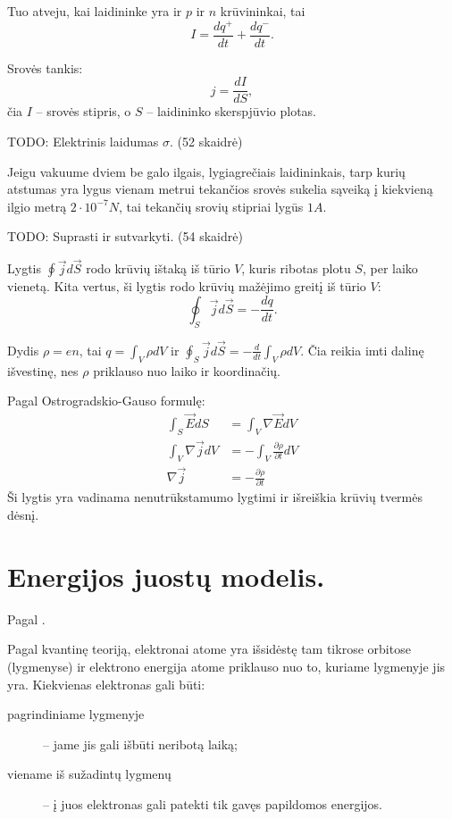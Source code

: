 Tuo atveju, kai laidininke yra ir $p$ ir $n$ krūvininkai, tai
\begin{equation*}
  I = \frac{dq^{+}}{dt} + \frac{dq^{-}}{dt}.
\end{equation*}

Srovės tankis:
\begin{equation*}
  j = \frac{dI}{dS},
\end{equation*}
čia $I$ – srovės stipris, o $S$ – laidininko skerspjūvio plotas.

TODO: Elektrinis laidumas $\sigma$. (52 skaidrė)

\begin{defn}[Amperas]
  Jeigu vakuume dviem be galo ilgais, lygiagrečiais laidininkais,
  tarp kurių atstumas yra lygus vienam metrui tekančios srovės
  sukelia sąveiką į kiekvieną ilgio metrą
  $2\cdot 10^{-7} N$, tai tekančių srovių stipriai lygūs $1A$.
\end{defn}

TODO: Suprasti ir sutvarkyti. (54 skaidrė)

Lygtis $\oint \vec{j} d \vec{S}$ rodo krūvių ištaką iš tūrio $V$,
kuris ribotas plotu $S$, per laiko vienetą. Kita vertus, ši
lygtis rodo krūvių mažėjimo greitį iš tūrio $V$:
\begin{equation*}
  \oint _{S} \vec{j} d \vec{S} = - \frac{dq}{dt}.
\end{equation*}

Dydis $\rho = en$, tai $q = \int_{V} \rho dV$ ir
$\oint _{S} \vec{j} d\vec{S} = - \frac{d}{dt}\int_{V} \rho dV$.
Čia reikia imti dalinę išvestinę, nes $\rho$ priklauso nuo laiko
ir koordinačių.

Pagal Ostrogradskio-Gauso formulę:
\begin{align*}
  \int _{S} \vec{E} d S &= \int _{V} \nabla \vec{E}dV \\
  \int _{V}\nabla\vec{j}dV &= -\int _{V}\frac{\partial \rho}{\partial t}dV \\
  \nabla \vec{j} &= -\frac{\partial \rho}{\partial t}
\end{align*}
Ši lygtis yra vadinama nenutrūkstamumo lygtimi ir išreiškia krūvių
tvermės dėsnį.

\section{Energijos juostų modelis.}

Pagal \cite[55p.]{elektra-magnetizmas}.

Pagal kvantinę teoriją, elektronai atome yra išsidėstę tam tikrose
orbitose (lygmenyse) ir elektrono energija atome priklauso nuo
to, kuriame lygmenyje jis yra. Kiekvienas elektronas gali būti:
\begin{description}
  \item[pagrindiniame lygmenyje] – jame jis gali išbūti neribotą laiką;
  \item[viename iš sužadintų lygmenų] – į juos elektronas gali
    patekti tik gavęs papildomos energijos.
\end{description}

